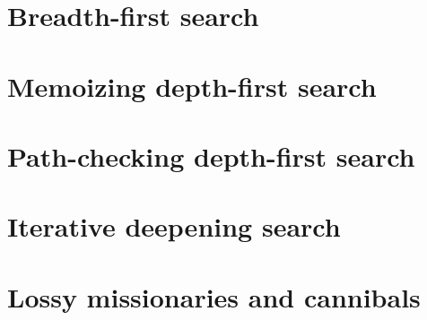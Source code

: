 \documentclass{article}
\begin{document}
\section{Breadth-first search}


\section{Memoizing depth-first search}

\section{Path-checking depth-first search}

\section{Iterative deepening search}



\section{Lossy missionaries and cannibals}
\end{document}
